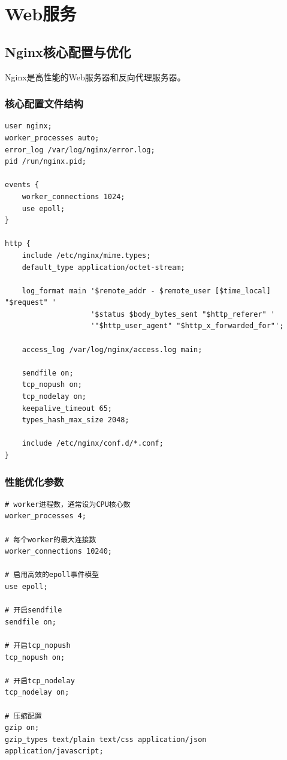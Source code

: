 \documentclass[12pt,UTF8]{ctexbook}
\begin{document}
\chapter{Web服务}
\label{chap:web-services}

\section{Nginx核心配置与优化}
\label{sec:nginx-core}

Nginx是高性能的Web服务器和反向代理服务器。

\subsection*{核心配置文件结构}
\begin{lstlisting}
user nginx;
worker_processes auto;
error_log /var/log/nginx/error.log;
pid /run/nginx.pid;

events {
    worker_connections 1024;
    use epoll;
}

http {
    include /etc/nginx/mime.types;
    default_type application/octet-stream;
    
    log_format main '$remote_addr - $remote_user [$time_local] "$request" '
                    '$status $body_bytes_sent "$http_referer" '
                    '"$http_user_agent" "$http_x_forwarded_for"';
    
    access_log /var/log/nginx/access.log main;
    
    sendfile on;
    tcp_nopush on;
    tcp_nodelay on;
    keepalive_timeout 65;
    types_hash_max_size 2048;
    
    include /etc/nginx/conf.d/*.conf;
}
\end{lstlisting}

\subsection*{性能优化参数}
\begin{lstlisting}
# worker进程数，通常设为CPU核心数
worker_processes 4;

# 每个worker的最大连接数
worker_connections 10240;

# 启用高效的epoll事件模型
use epoll;

# 开启sendfile
sendfile on;

# 开启tcp_nopush
tcp_nopush on;

# 开启tcp_nodelay
tcp_nodelay on;

# 压缩配置
gzip on;
gzip_types text/plain text/css application/json application/javascript;
\end{lstlisting}
\end{document}
